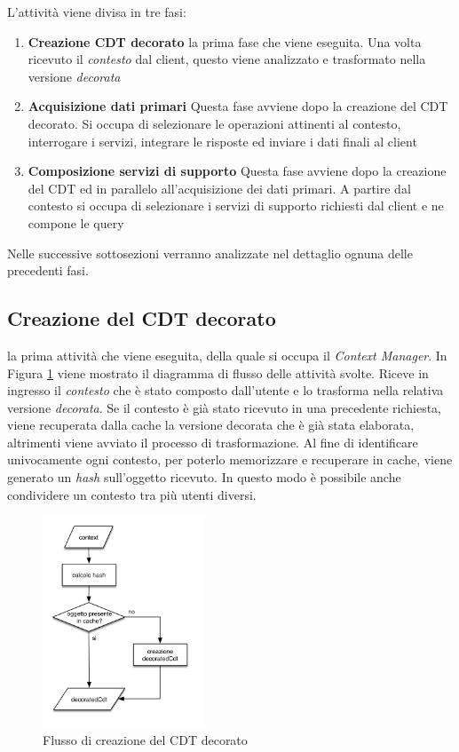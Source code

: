 L'attività viene divisa in tre fasi:

\begin{enumerate}
	\item \textbf{Creazione CDT decorato} \upe la prima fase che viene eseguita. Una volta ricevuto il \emph{contesto} dal client, questo viene analizzato e trasformato nella versione \emph{decorata}
	\item \textbf{Acquisizione dati primari} Questa fase avviene dopo la creazione del CDT decorato. Si occupa di selezionare le operazioni attinenti al contesto, interrogare i servizi, integrare le risposte ed inviare i dati finali al client
	\item \textbf{Composizione servizi di supporto} Questa fase avviene dopo la creazione del CDT ed in parallelo all'acquisizione dei dati primari. A partire dal contesto si occupa di selezionare i servizi di supporto richiesti dal client e ne compone le query
\end{enumerate}

Nelle successive sottosezioni verranno analizzate nel dettaglio ognuna delle precedenti fasi.

\subsection*{Creazione del CDT decorato}

\upe la prima attività che viene eseguita, della quale si occupa il \emph{Context Manager}. In Figura \ref{fig:flusso-decorated-cdt} viene mostrato il diagramma di flusso delle attività svolte. Riceve in ingresso il \emph{contesto} che è stato composto dall'utente e lo trasforma nella relativa versione \emph{decorata}. Se il contesto è già stato ricevuto in una precedente richiesta, viene recuperata dalla cache la versione decorata che è già stata elaborata, altrimenti viene avviato il processo di trasformazione. Al fine di identificare univocamente ogni contesto, per poterlo memorizzare e recuperare in cache, viene generato un \emph{hash} sull'oggetto ricevuto. In questo modo è possibile anche condividere un contesto tra più utenti diversi.

\begin{figure}[ht]
	\centering
	\includegraphics[width=0.43\textwidth]{5-implementazione-backend/Immagini/diagramma_flusso_decoratedCdt.png}
	\caption{Flusso di creazione del CDT decorato\label{fig:flusso-decorated-cdt}}
\end{figure}

